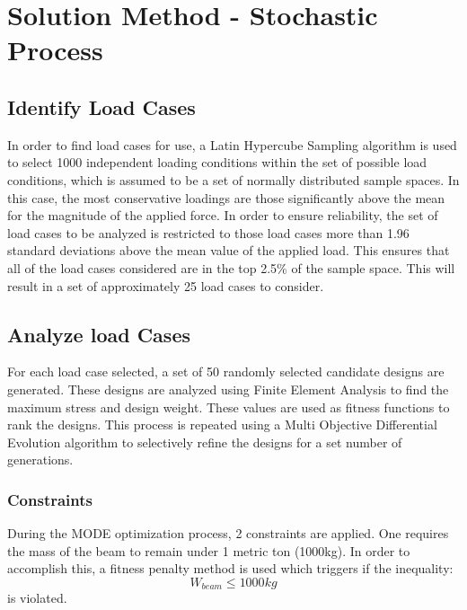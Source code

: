 \section{Solution Method - Stochastic Process}
\subsection{Identify Load Cases}
In order to find load cases for use, a Latin Hypercube Sampling algorithm is used to select 1000 independent loading conditions within the set of possible load conditions, which is assumed to be a set of normally distributed sample spaces. In this case, the most conservative loadings are those significantly above the mean for the magnitude of the applied force. In order to ensure reliability, the set of load cases to be analyzed is restricted to those load cases more than 1.96 standard deviations above the mean value of the applied load. This ensures that all of the load cases considered are in the top 2.5\% of the sample space. This will result in a set of approximately 25 load cases to consider. 
\subsection{Analyze load Cases} 
For each load case selected, a set of 50 randomly selected candidate designs are generated. These designs are analyzed using Finite Element Analysis to find the maximum stress and design weight. These values are used as fitness functions to rank the designs. This process is repeated using a Multi Objective Differential Evolution algorithm to selectively refine the designs for a set number of generations. 
\subsubsection{Constraints}
During the MODE optimization process, 2 constraints are applied. One requires the mass of the beam to remain under 1 metric ton (1000kg). In order to accomplish this, a fitness penalty method is used which triggers if the inequality:
$$
W_{beam} \leq 1000kg
$$
is violated. 

